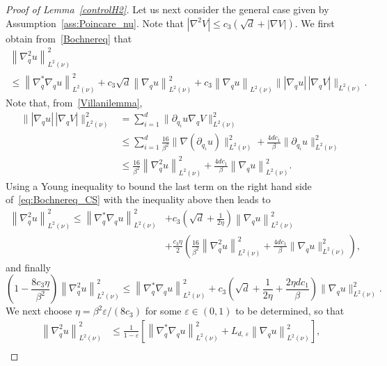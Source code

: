 \documentclass[10pt]{amsart}
\theoremstyle{definition}\newtheorem{defi}[theo]{Definition}\newtheorem{rema}[theo]{Remark}\newtheorem{exam}[theo]{Example}\newtheorem{exem}[theo]{Example}\newtheorem{nota}[theo]{Notation}
\renewcommand{\leq}{\leqslant}
\begin{document}
\begin{proof}[Proof of Lemma~\ref{controlH2}]
Let us next consider the general case given by Assumption~\ref{ass:Poincare_nu}. Note that $|\nabla^2 V|\leq c_3(\sqrt{d}+|\nabla V|)$. We first obtain from~\eqref{Bochnereq} that
\begin{multline}\label{eq:Bochnereq_CS}
\left\|\nabla_q^2 u\right\|_{L^2(\nu)}^2 \\
\leq \left\|\nabla_q^{*}\nabla_q u \right\|_{L^2(\nu)}^2+ c_{3}\sqrt{d}\left\|\nabla_q u\right\|_{L^2(\nu)}^2 + c_{3}\left\|\nabla_q u\right\|_{L^2(\nu)}\big\| \left|\nabla_{q}u\right| \, \left| \nabla_{q}V\right| \big\|_{L^2(\nu)}.
\end{multline}
Note that, from~\eqref{Villanilemma},
\begin{align*}
\big\| \left|\nabla_{q}u\right| \, \left| \nabla_{q}V\right| \big\|_{L^2(\nu)}^2 & = \sum_{i=1}^d \big\| \partial_{q_i}u \nabla_{q}V \big\|_{L^2(\nu)}^2\\
&\leq \sum_{i=1}^d \frac{16}{\beta^2} \big\|\nabla \left(\partial_{q_i}u\right) \big\|^2_{L^2(\nu)} + \frac{4d c_1}{\beta} \big\|\partial_{q_i}u \big\|^2_{L^2(\nu)} \\
& \leq \frac{16}{\beta^2} \left\|\nabla_q^2 u \right\|^2_{L^2(\nu)} + \frac{4d c_1}{\beta} \left\|\nabla_q u \right\|^2_{L^2(\nu)}.
\end{align*}
Using a Young inequality to bound the last term on the right hand side of~\eqref{eq:Bochnereq_CS} with the inequality above then leads to
\begin{align*}
\left\|\nabla_q^2 u\right\|_{L^2(\nu)}^2 \leq \left\|\nabla_q^{*}\nabla_q u \right\|_{L^2(\nu)}^2 &+ c_{3} \left(\sqrt{d}+ \frac{1}{2\eta} \right) \left\|\nabla_q u\right\|_{L^2(\nu)}^2 \\
&+ \frac{c_3 \eta}{2} \left(\frac{16}{\beta^2} \left\|\nabla_q^2u\right\|_{L^2(\nu)}^2 + \frac{4dc_1}{\beta} \big\|\nabla_q u\big\|_{L^2(\nu)}^2\right),
\end{align*}
and finally
\[
\left(1 - \frac{8c_3 \eta}{\beta^2}\right)\left\|\nabla_q^2 u\right\|_{L^2(\nu)}^2 \leq \left\|\nabla_q^{*}\nabla_q u \right\|_{L^2(\nu)}^2 + c_3\left(\sqrt{d}+\frac{1}{2\eta} + \frac{2\eta dc_1}{\beta} \right) \big\|\nabla_q u\big\|_{L^2(\nu)}^2.
\]
We next choose $\eta = \beta^2\varepsilon/(8c_3)$ for some $\varepsilon \in (0,1)$ to be determined, so that
\begin{align*}
\left\|\nabla_q^2 u\right\|_{L^2(\nu)}^2 &\leq \frac{1}{1-\varepsilon} \left[\left\|\nabla_q^{*}\nabla_q u \right\|_{L^2(\nu)}^2 + L_{d,\,\varepsilon} \left\|\nabla_q u\right\|_{L^2(\nu)}^2\right],
\\

\end{align*}
\end{proof}
\end{document}
